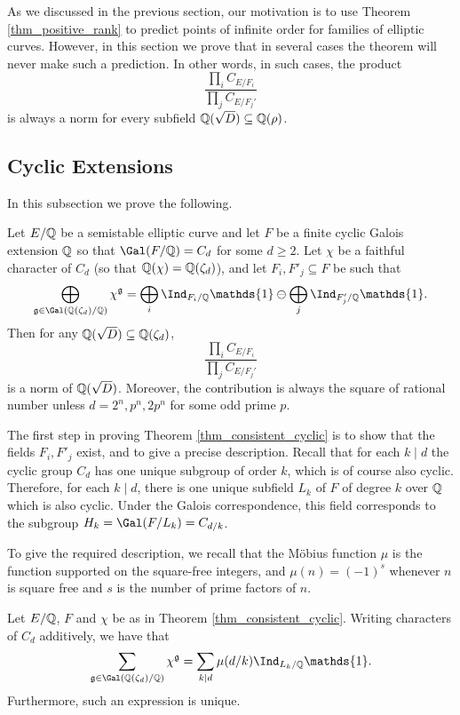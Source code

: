 As we discussed in the previous section, our motivation is to use Theorem \ref*{thm_positive_rank} to predict points of infinite order for families of elliptic curves. However, in this section we prove that in several cases the theorem will never make such a prediction. In other words, in such cases, the product 
$$\frac{\prod_i C_{E/F_i}}{\prod_j C_{E/F_j'}}$$ 
is always a norm for every subfield $\mathbb{Q}(\sqrt{D})\subseteq\mathbb{Q}(\rho)$.

\subsection{Cyclic Extensions}
In this subsection we prove the following. 
\begin{thm}\label{thm_consistent_cyclic}
    Let $E/\mathbb{Q}$ be a semistable elliptic curve and let $F$ be a finite cyclic Galois extension $\mathbb{Q}$ so that $\Gal(F/\QQ)=C_d$ for some $d\geq 2$. Let $\chi$ be a faithful character of $C_d$ (so that $\mathbb{Q}(\chi)=\mathbb{Q}(\zeta_d)$), and let $F_i,F'_j\subseteq F$ be such that
    $$\bigoplus_{\mathfrak{g}\in\Gal(\QQ(\zeta_d)/\QQ)}\chi^{\mathfrak{g}}=\bigoplus_i\Ind_{F_i/\QQ}\mathds{1}\ominus\bigoplus_j\Ind_{F'_j/\QQ}\mathds{1}.$$
    Then for any $\mathbb{Q}(\sqrt{D})\subseteq\mathbb{Q}(\zeta_d)$,
    $$\frac{\prod_i C_{E/F_i}}{\prod_j C_{E/F_j'}}$$
    is a norm of $\mathbb{Q}(\sqrt{D})$. Moreover, the contribution is always the square of rational number unless $d=2^n, p^n,2p^n$ for some odd prime $p$.
\end{thm}

The first step in proving Theorem \ref*{thm_consistent_cyclic} is to show that the fields $F_i, F'_j$ exist, and to give a precise description. Recall that for each $k\mid d$ the cyclic group $C_d$ has one unique subgroup of order $k$, which is of course also cyclic. Therefore, for each $k\mid d$, there is one unique subfield $L_k$ of $F$ of degree $k$ over $\mathbb{Q}$ which is also cyclic. Under the Galois correspondence, this field corresponds to the subgroup $H_k=\Gal(F/L_k)=C_{d/k}$.

To give the required description, we recall that the Möbius function $\mu$ is the function supported on the square-free integers, and $\mu(n)=(-1)^s$ whenever $n$ is square free and $s$ is the number of prime factors of $n$.

\begin{lemma}\label{lem_cyclic_decomp}
    Let $E/\mathbb{Q}$, $F$ and $\chi$ be as in Theorem \ref*{thm_consistent_cyclic}. Writing characters of $C_d$ additively, we have that
    \begin{equation}\label{eqn_cyclic_relation}
        \sum_{\mathfrak{g}\in\Gal(\QQ(\zeta_d)/\QQ)}\chi^{\mathfrak{g}}=\sum_{k\mid d}\mu(d/k)\Ind_{L_k/\QQ}\mathds{1}.
    \end{equation}
    Furthermore, such an expression is unique.
\end{lemma}

